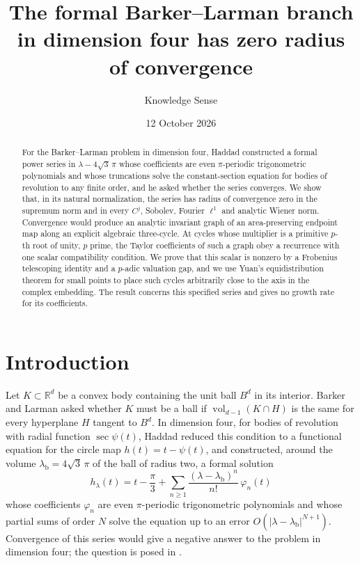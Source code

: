 \documentclass[11pt]{amsart}
\title[Zero radius of convergence of the formal branch]{The formal Barker--Larman branch in dimension four has zero radius of convergence}
\author{Knowledge Sense}
\date{12 October 2026}
\numberwithin{equation}{section}
\theoremstyle{definition}
\theoremstyle{remark}
\newcommand{\R}{\mathbb{R}}
\newcommand{\abs}[1]{\lvert #1\rvert}
\newcommand{\vol}{\operatorname{vol}}
\newcommand{\lb}{\lambda_{\mathrm b}}
\begin{document}
\begin{abstract}
For the Barker--Larman problem in dimension four, Haddad constructed a formal power series in $\lambda-4\sqrt3\,\pi$ whose coefficients are even $\pi$-periodic trigonometric polynomials and whose truncations solve the constant-section equation for bodies of revolution to any finite order, and he asked whether the series converges. We show that, in its natural normalization, the series has radius of convergence zero in the supremum norm and in every $C^j$, Sobolev, Fourier $\ell^1$ and analytic Wiener norm. Convergence would produce an analytic invariant graph of an area-preserving endpoint map along an explicit algebraic three-cycle. At cycles whose multiplier is a primitive $p$-th root of unity, $p$ prime, the Taylor coefficients of such a graph obey a recurrence with one scalar compatibility condition. We prove that this scalar is nonzero by a Frobenius telescoping identity and a $p$-adic valuation gap, and we use Yuan's equidistribution theorem for small points to place such cycles arbitrarily close to the axis in the complex embedding. The result concerns this specified series and gives no growth rate for its coefficients.
\end{abstract}

\maketitle

\section{Introduction}\label{sec:intro}

Let $K\subset\R^d$ be a convex body containing the unit ball $B^d$ in its interior. Barker and Larman \cite{BL} asked whether $K$ must be a ball if $\vol_{d-1}(K\cap H)$ is the same for every hyperplane $H$ tangent to $B^d$. In dimension four, for bodies of revolution with radial function $\sec\psi(t)$, Haddad \cite{Had} reduced this condition to a functional equation for the circle map $h(t)=t-\psi(t)$, and constructed, around the volume $\lb=4\sqrt3\,\pi$ of the ball of radius two, a formal solution
\[
h_\lambda(t)=t-\frac\pi3+\sum_{n\ge1}\frac{(\lambda-\lb)^n}{n!}\,\varphi_n(t)
\]
whose coefficients $\varphi_n$ are even $\pi$-periodic trigonometric polynomials and whose partial sums of order $N$ solve the equation up to an error $O(\abs{\lambda-\lb}^{N+1})$. Convergence of this series would give a negative answer to the problem in dimension four; the question is posed in \cite[Section 6.1]{Had}.
\end{document}
